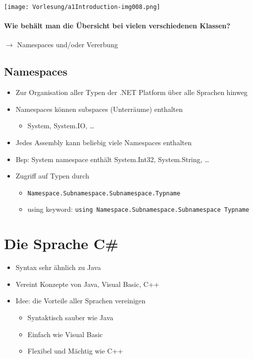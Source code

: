 \begin{center}
\texttt{[image: Vorlesung/a1Introduction-img008.png]}
\end{center} 


\paragraph{Wie behält man die Übersicht bei vielen verschiedenen Klassen?}
$\to$ Namespaces und/oder Vererbung

\subsection{Namespaces}
\begin{itemize}
\item Zur Organisation aller Typen der .NET Platform über alle Sprachen hinweg
\item Namespaces können subspaces (Unterräume) enthalten
\begin{itemize}
\item System, System.IO, … 
\end{itemize}
\item Jedes Assembly kann beliebig viele Namespaces enthalten 
\item Bsp: System namespace enthält System.Int32, System.String, …
\item Zugriff auf Typen durch
\begin{itemize}
\item \lstinline$Namespace.Subnamespace.Subnamespace.Typname$
\item using keyword: \lstinline$using Namespace.Subnamespace.Subnamespace Typname$
\end{itemize}
\end{itemize}

\section{Die Sprache C\#}
\begin{itemize}
\item Syntax sehr ähnlich zu Java
\item Vereint Konzepte von Java, Visual Basic, C++
\item Idee: die Vorteile aller Sprachen vereinigen
\begin{itemize}
\item Syntaktisch sauber wie Java
\item Einfach wie Visual Basic
\item Flexibel und Mächtig wie C++
\end{itemize}
\end{itemize}

